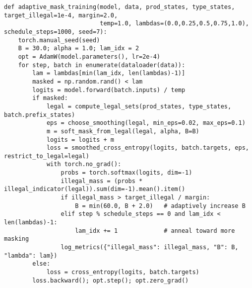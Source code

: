 \documentclass{article}
\begin{document}
\begin{lstlisting}[style=py, caption={Adaptive masked training with leakage target and mixture for calibration.}]
def adaptive_mask_training(model, data, prod_states, type_states, target_illegal=1e-4, margin=2.0, 
                           temp=1.0, lambdas=(0.0,0.25,0.5,0.75,1.0), schedule_steps=1000, seed=7):
    torch.manual_seed(seed)
    B = 30.0; alpha = 1.0; lam_idx = 2
    opt = AdamW(model.parameters(), lr=2e-4)
    for step, batch in enumerate(dataloader(data)):
        lam = lambdas[min(lam_idx, len(lambdas)-1)]
        masked = np.random.rand() < lam
        logits = model.forward(batch.inputs) / temp
        if masked:
            legal = compute_legal_sets(prod_states, type_states, batch.prefix_states)
            eps = choose_smoothing(legal, min_eps=0.02, max_eps=0.1)
            m = soft_mask_from_legal(legal, alpha, B=B)
            logits = logits + m
            loss = smoothed_cross_entropy(logits, batch.targets, eps, restrict_to_legal=legal)
            with torch.no_grad():
                probs = torch.softmax(logits, dim=-1)
                illegal_mass = (probs * illegal_indicator(legal)).sum(dim=-1).mean().item()
                if illegal_mass > target_illegal / margin:
                    B = min(60.0, B + 2.0)   # adaptively increase B
                elif step % schedule_steps == 0 and lam_idx < len(lambdas)-1:
                    lam_idx += 1             # anneal toward more masking
                log_metrics({"illegal_mass": illegal_mass, "B": B, "lambda": lam})
        else:
            loss = cross_entropy(logits, batch.targets)
        loss.backward(); opt.step(); opt.zero_grad()
\end{lstlisting}
\end{document}
